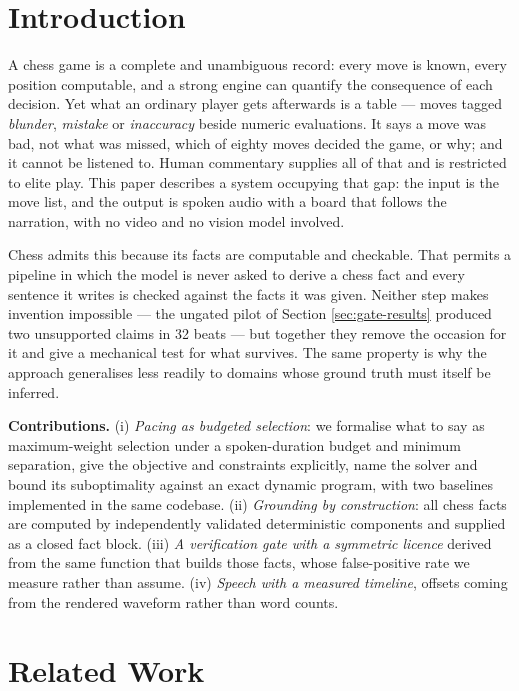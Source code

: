 \documentclass[conference]{IEEEtran}
\begin{document}
\section{Introduction}

A chess game is a complete and unambiguous record: every move is known,
every position computable, and a strong engine can quantify the consequence
of each decision. Yet what an ordinary player gets afterwards is a table ---
moves tagged \emph{blunder}, \emph{mistake} or \emph{inaccuracy} beside
numeric evaluations. It says a move was bad, not what was missed, which of
eighty moves decided the game, or why; and it cannot be listened to. Human
commentary supplies all of that and is restricted to elite play. This paper
describes a system occupying that gap: the input is the move list, and the
output is spoken audio with a board that follows the narration, with no
video and no vision model involved.

Chess admits this because its facts are computable and checkable. That
permits a pipeline in which the model is never asked to derive a chess fact
and every sentence it writes is checked against the facts it was given.
Neither step makes invention impossible --- the ungated pilot of Section
\ref{sec:gate-results} produced two unsupported claims in 32 beats --- but
together they remove the occasion for it and give a mechanical test for what
survives. The same property is why the approach generalises less readily to
domains whose ground truth must itself be inferred.

\textbf{Contributions.}
(i) \emph{Pacing as budgeted selection}: we formalise what to say as
maximum-weight selection under a spoken-duration budget and minimum
separation, give the objective and constraints explicitly, name the solver
and bound its suboptimality against an exact dynamic program, with two
baselines implemented in the same codebase.
(ii) \emph{Grounding by construction}: all chess facts are computed by
independently validated deterministic components and supplied as a closed
fact block.
(iii) \emph{A verification gate with a symmetric licence} derived from the
same function that builds those facts, whose false-positive rate we measure
rather than assume.
(iv) \emph{Speech with a measured timeline}, offsets coming from the
rendered waveform rather than word counts.

\section{Related Work}
\end{document}
